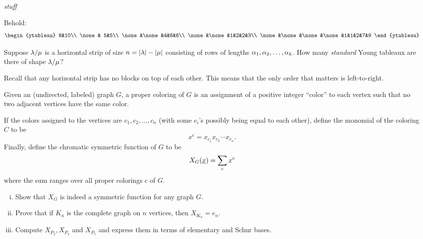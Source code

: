\documentclass[12pt]{memoir}
\begin{document}
\begin{Ej}[Mandatory]
\emph{stuff}
\end{Ej}

\begin{ptcbr}
    Behold:
    $$
    \begin{ytableau}
        8&10\\
        \none & 5&5\\
        \none&\none&4&6&6\\
        \none&\none&1&2&2&3\\
        \none&\none&\none&\none&1&1&2&7&9
        \end{ytableau}
    $$
\end{ptcbr}

\begin{Ej}[Exercise 3]
   Suppose $\lambda/\mu$ is a horizontal strip of size $n=|\lambda|-|\mu|$ consisting of rows of lengths $\alpha_1,\alpha_2,\dots,\alpha_k$. How many \emph{standard} Young tableaux are there of shape $\lambda/\mu$? 
\end{Ej}

\begin{ptcbr}
   Recall that any horizontal strip has no blocks on top of each other. This means that the only order that matters is left-to-right. 
\end{ptcbr}

\begin{Ej}
    Given an (undirected, labeled) graph $G$, a proper coloring of $G$ is an assignment of a positive integer “color” to each vertex such that no two adjacent vertices have the same color.\par 
    If the colors assigned to the vertices are $c_1, c_2,\dots , c_n$ (with some $c_i$'s possibly being
equal to each other), define the monomial of the coloring $C$ to be 
$$x^c = x_{c_1} x_{c_2}\cdots x_{c_n}.$$  
Finally, define the chromatic symmetric function of $G$ to be
$$X_G(\underline x)=\sum_cx^c$$
where the sum ranges over all proper colorings $c$ of $G$.
\begin{enumerate}[i)]
    \itemsep=-0.4em
    \item Show that $X_G$ is indeed a symmetric function for any graph $G$.
    \item Prove that if $K_n$ is the complete graph on $n$ vertices, then $X_{K_n}=e_n$.
    \item Compute $X_{P_3},X_{P_4}$ and $X_{P_5}$ and express them in terms of elementary and Schur bases.
\end{enumerate}
\end{Ej}
\end{document}
